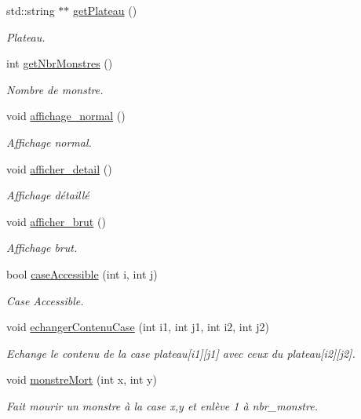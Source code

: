\begin{DoxyCompactItemize}
std\+::string $\ast$$\ast$ \hyperlink{class_carte_a28937b5fe965b58289aee6ca0df3ca94}{get\+Plateau} ()
\begin{DoxyCompactList}\small\item\em Plateau. \end{DoxyCompactList}\item 
int \hyperlink{class_carte_abc46efd826637fba019f970df54919cc}{get\+Nbr\+Monstres} ()
\begin{DoxyCompactList}\small\item\em Nombre de monstre. \end{DoxyCompactList}\item 
void \hyperlink{class_carte_aa02757760851d19e549990e222d11fb5}{affichage\+\_\+normal} ()
\begin{DoxyCompactList}\small\item\em Affichage normal. \end{DoxyCompactList}\item 
void \hyperlink{class_carte_a11799a279fe00dc195ce80bfeb84b1fa}{afficher\+\_\+detail} ()
\begin{DoxyCompactList}\small\item\em Affichage détaillé \end{DoxyCompactList}\item 
void \hyperlink{class_carte_a4f7a245946c6d2044b35f2137985746b}{afficher\+\_\+brut} ()
\begin{DoxyCompactList}\small\item\em Affichage brut. \end{DoxyCompactList}\item 
bool \hyperlink{class_carte_a3ea9d86aa5ace5a21216a23c7bfb1bab}{case\+Accessible} (int i, int j)
\begin{DoxyCompactList}\small\item\em Case Accessible. \end{DoxyCompactList}\item 
void \hyperlink{class_carte_aac7d187afdc3bf0ded53535c0d0b9ec0}{echanger\+Contenu\+Case} (int i1, int j1, int i2, int j2)
\begin{DoxyCompactList}\small\item\em Echange le contenu de la case plateau\mbox{[}i1\mbox{]}\mbox{[}j1\mbox{]} avec ceux du plateau\mbox{[}i2\mbox{]}\mbox{[}j2\mbox{]}. \end{DoxyCompactList}\item 
void \hyperlink{class_carte_a80fa02e7f8da63b43c62e454082923b4}{monstre\+Mort} (int x, int y)
\begin{DoxyCompactList}\small\item\em Fait mourir un monstre à la case x,y et enlève 1 à nbr\+\_\+monstre. \end{DoxyCompactList}\end{DoxyCompactItemize}
